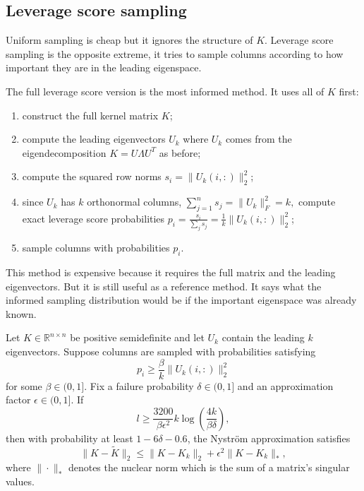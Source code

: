 
\subsection{Leverage score sampling}

Uniform sampling is cheap but it ignores the structure of $K$. Leverage score sampling is the opposite extreme, it tries to sample columns according to how important they are in the leading eigenspace.

The full leverage score version is the most informed method. It uses all of $K$ first:
\begin{enumerate}
\item construct the full kernel matrix $K$;
\item compute the leading eigenvectors $U_k$ where $U_k$ comes from the eigendecomposition $K=U\Lambda U^T$ as before;
\item compute the squared row norms $s_i=\|U_k(i,:)\|_2^2$;
\item since $U_k$ has $k$ orthonormal columns, $\sum_{j=1}^n s_j=\|U_k\|_F^2=k,$ compute exact leverage score probabilities $p_i=\frac{s_i}{\sum_j s_j}=\frac{1}{k}\|U_k(i,:)\|_2^2$;
\item sample columns with probabilities $p_i$.
\end{enumerate} \citep{drineas2012fast,gittens2016revisiting}

This method is expensive because it requires the full matrix and the leading eigenvectors. But it is still useful as a reference method. It says what the informed sampling distribution would be if the important eigenspace was already known.

\begin{theorem}
Let $K\in\mathbb{R}^{n\times n}$ be positive semidefinite and let $U_k$ contain the leading $k$ eigenvectors. Suppose columns are sampled with probabilities satisfying
\[
p_i\geq\frac{\beta}{k}\|U_k(i,:)\|_2^2
\] for some $\beta\in(0,1]$.
Fix a failure probability $\delta\in(0,1]$ and an approximation factor $\epsilon\in(0,1]$. If
\[
l\geq \frac{3200}{\beta\epsilon^2}k \log\left(\frac{4k}{\beta\delta}\right),
\]
then with probability at least $1-6\delta-0.6$, the Nystr\"om approximation satisfies
\[
\|K-\tilde K\|_2 \leq \|K-K_k\|_2+\epsilon^2\|K-K_k\|_*,
\] where $\|\cdot\|_*$ denotes the nuclear norm which is the sum of a matrix's singular values.
\end{theorem}

